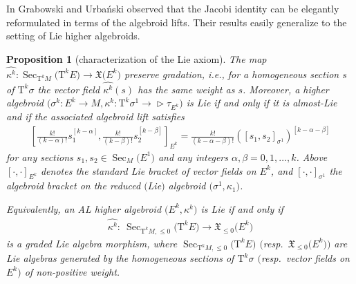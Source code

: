 \documentclass[10pt,a4paper]{amsart}
\newcommand{\wh}[1]{\widehat{#1}} %
\newcommand{\Sec}{\operatorname{Sec}}
\newcommand{\X}{\mathfrak{X}}
\newcommand{\ra}{\rightarrow}
\newcommand{\TT}[1]{\mathrm{T}^{#1}} %
\def\relto{\rightarrow\!\!\vartriangleright} %
\numberwithin{equation}{section}
\newtheorem{prop}[thm]{Proposition}
\theoremstyle{definition}
\begin{document}
In \cite{JG_PU_Lie_alg_P-N_str_1997} Grabowski and Urba\'nski observed that the Jacobi identity can be elegantly reformulated in terms of the algebroid lifts. Their results easily generalize to the setting of Lie higher algebroids.

\begin{prop}[characterization of the Lie axiom]\label{prop:Lie_HA}
 The map $\wh{\kappa^k}\colon \Sec_{\TT{k}M} \big(\TT{k} E\big)\ra \X\big(E^k\big)$ preserve gradation, i.e., for a homogeneous section $s$ of $\TT{k} \sigma$ the vector field $\wh{ \kappa^k}(s)$ has the same weight as $s$. Moreover, a
higher algebroid $\big(\sigma^k\colon E^k\ra M,\kappa^k\colon \TT{k}\sigma^1\relto\tau_{E^k}\big)$ is Lie if and only if it is almost-Lie and if the associated algebroid lift satisfies
\begin{gather}\label{eqn:Lie_HA}
\left[\frac{k!}{(k-\alpha)!} s_1^{[k-\alpha]}, \frac{k!}{(k-\beta)!}s_2^{[k-\beta]}\right]_{E^k}=\frac{k!}{(k-\alpha-\beta)!}([s_1,s_2]_{\sigma^1})^{[k-\alpha-\beta]}
\end{gather}
for any sections $s_1,s_2\in\Sec_M\big(E^1\big)$ and any integers $\alpha,\beta=0,1,\hdots,k$. Above $[\cdot,\cdot]_{E^k}$ denotes the standard Lie bracket of vector fields on $E^k$, and $[\cdot,\cdot]_{\sigma^1}$ the algebroid bracket on the reduced $($Lie$)$ algebroid $\big(\sigma^1,\kappa_1\big)$.

Equivalently, an AL higher algebroid $\big(E^k, \kappa^k\big)$ is Lie if and only if
\begin{gather}\label{eqn:Lie_HA_leq0}
\wh{\kappa^k}\colon \ \Sec_{\TT{k} M, \leq0}\big(\TT{k} E\big) \ra \X_{\leq0}\big(E^k\big)
\end{gather}
is a graded Lie algebra morphism, where $\Sec_{\TT{k} M, \leq0}\big(\TT{k} E\big)$ $($resp.~$\X_{\leq0}\big(E^k\big))$ are Lie algebras generated by the homogeneous sections of $\TT{k}\sigma$ $($resp.\ vector fields on $E^k)$ of non-positive weight.
\end{prop}
\end{document}
